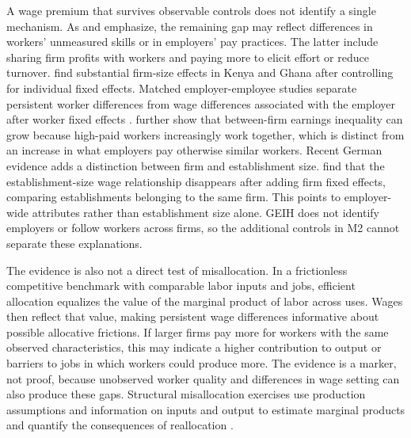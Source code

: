 A wage premium that survives observable controls does not identify a single
mechanism. As \citet{BrownMedoff1989} and \citet{OiIdson1999} emphasize, the
remaining gap may reflect differences in workers' unmeasured skills or in
employers' pay practices. The latter include sharing firm profits with workers
and paying more to elicit effort or reduce turnover.
\citet{SoderbomTealWambugu2005} find substantial firm-size effects in Kenya and
Ghana after controlling for individual fixed effects. Matched employer-employee
studies separate persistent worker differences from wage differences associated
with the employer after worker fixed effects
\citep{AbowdKramarzMargolis1999,CardHeiningKline2013,
AlvarezBenguriaEngbomMoser2018,GerardLagosSeverniniCard2021,EngbomMoser2022}.
\citet{Song2019} further show that between-firm earnings inequality can grow
because high-paid workers increasingly work together, which is distinct from
an increase in what employers pay otherwise similar workers.
Recent German evidence adds a distinction between firm and establishment size.
\citet{DiegmannMullerSchoefer2026} find that the establishment-size
wage relationship disappears after adding firm fixed effects, comparing
establishments belonging to the same firm. This points to employer-wide
attributes rather than establishment size alone. GEIH does not
identify employers or follow workers across firms, so the additional controls
in M2 cannot separate these explanations.

The evidence is also not a direct test of misallocation. In a
frictionless competitive benchmark with comparable labor inputs and jobs,
efficient allocation equalizes the value of the marginal product of labor
across uses. Wages then reflect that value, making persistent wage differences informative
about possible allocative frictions. If larger firms pay more for workers with
the same observed characteristics, this may indicate a higher contribution to
output or barriers to jobs in which workers could produce more. The evidence
is a marker, not proof, because
unobserved worker quality and differences in wage setting can also produce
these gaps. Structural misallocation exercises use production assumptions and
information on inputs and output to estimate marginal products and quantify
the consequences of reallocation \citep{hsieh2009misallocation}.

